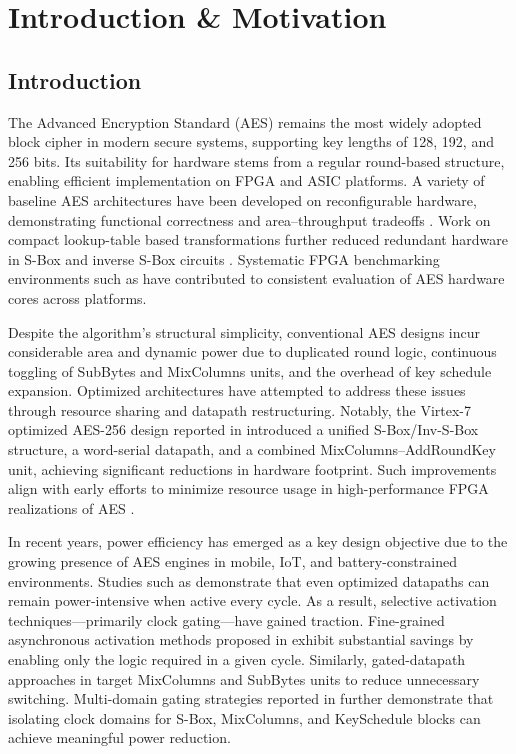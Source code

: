 \chapter{Introduction \& Motivation}

\section{Introduction}
The Advanced Encryption Standard (AES) remains the most widely adopted block cipher in
modern secure systems, supporting key lengths of 128, 192, and 256 bits. Its suitability for
hardware stems from a regular round-based structure, enabling efficient implementation on
FPGA and ASIC platforms. A variety of baseline AES architectures have been developed on
reconfigurable hardware, demonstrating functional correctness and area–throughput tradeoffs
\cite{sai_srinivas_fpga_2016, abhijith_high_2013}. Work on compact lookup-table based
transformations further reduced redundant hardware in S-Box and inverse S-Box circuits
\cite{rajeswara_rao_fpga_2017}. Systematic FPGA benchmarking environments such as
\cite{guruprasad2018evaluation} have contributed to consistent evaluation of AES hardware
cores across platforms.

Despite the algorithm's structural simplicity, conventional AES designs incur considerable
area and dynamic power due to duplicated round logic, continuous toggling of SubBytes and
MixColumns units, and the overhead of key schedule expansion. Optimized architectures have
attempted to address these issues through resource sharing and datapath restructuring.
Notably, the Virtex-7 optimized AES-256 design reported in 
\cite{gunasekaran_aes256_virtex7} introduced a unified S-Box/Inv-S-Box structure, a
word-serial datapath, and a combined MixColumns--AddRoundKey unit, achieving significant
reductions in hardware footprint. Such improvements align with early efforts to minimize
resource usage in high-performance FPGA realizations of AES
\cite{abhijith_high_2013, rajeswara_rao_fpga_2017}.

In recent years, power efficiency has emerged as a key design objective due to the growing
presence of AES engines in mobile, IoT, and battery-constrained environments. Studies such
as \cite{feng2021_energy_efficient_aes, ibrahim2021_highspeed_resourceefficient_aes}
demonstrate that even optimized datapaths can remain power-intensive when active every
cycle. As a result, selective activation techniques—primarily clock gating—have gained
traction. Fine-grained asynchronous activation methods proposed in
\cite{selvapriya2023lowpower} exhibit substantial savings by enabling only the logic
required in a given cycle. Similarly, gated-datapath approaches in 
\cite{darwish2022configurable} target MixColumns and SubBytes units to reduce unnecessary 
switching. Multi-domain gating strategies reported in \cite{lee2021multidomain} further 
demonstrate that isolating clock domains for S-Box, MixColumns, and KeySchedule blocks can 
achieve meaningful power reduction.

